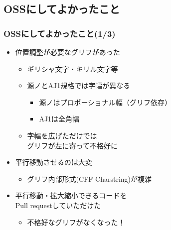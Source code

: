 \subsection{OSSにしてよかったこと}
\begin{frame}\frametitle{OSSにしてよかったこと(1/3)}
  \begin{itemize}
  \item 位置調整が必要なグリフがあった
    \begin{itemize}
    \item ギリシャ文字・キリル文字等
    \item 源ノとAJ1規格では字幅が異なる
      \begin{itemize}
      \item 源ノはプロポーショナル幅（グリフ依存）
      \item AJ1は全角幅
      \end{itemize}
    \item 字幅を広げただけでは \\ グリフが左に寄って不格好に
    \end{itemize}
  \item 平行移動させるのは大変
    \begin{itemize}
    \item グリフ内部形式(CFF Charstring)が複雑
    \end{itemize}
  \item 平行移動・拡大縮小できるコードを \\ Pull requestしていただけた
    \begin{itemize}
    \item 不格好なグリフがなくなった！
    \end{itemize}
  \end{itemize}
\end{frame}

